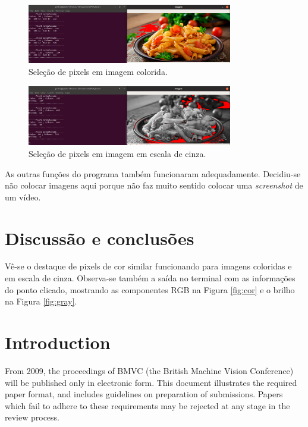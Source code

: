 \documentclass{bmvc2k}
\begin{document}
\begin{figure}[htpb]
\begin{center}
\includegraphics[width=0.8\textwidth]{Figs/img2.png}
\end{center}
   \caption{Seleção de pixels em imagem colorida.}
   \label{fig:cor}
\label{fig:short}
\end{figure}

\begin{figure}[htpb]
\begin{center}
\includegraphics[width=0.8\textwidth]{Figs/img1.png}
\end{center}
   \caption{Seleção de pixels em imagem em escala de cinza.}
   \label{fig:gray}
\label{fig:short}
\end{figure}

As outras funções do programa também funcionaram adequadamente. Decidiu-se não colocar imagens aqui porque não faz muito sentido colocar uma \textit{screenshot} de um vídeo. 

\section{Discussão e conclusões}
\label{sec:concl}

Vê-se o destaque de pixels de cor similar funcionando para imagens coloridas e em escala de cinza. Observa-se também a saída no terminal com as informações do ponto clicado, mostrando as componentes RGB na Figura \ref{fig:cor} e o brilho na Figura \ref{fig:gray}.









\iffalse
\section{Introduction}
\label{sec:intro}
From 2009, the proceedings of BMVC (the British Machine Vision
Conference) will be published only in electronic form.  This document
illustrates the required paper format, and includes guidelines on
preparation of submissions.  Papers which fail to adhere to these
requirements may be rejected at any stage in the review process.
\end{document}
